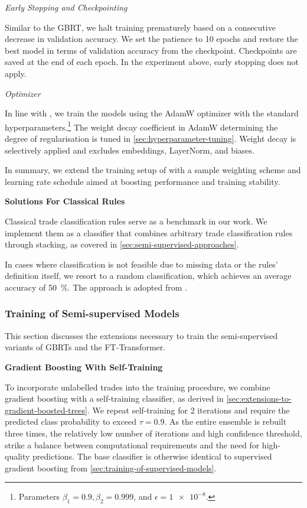 \emph{Early Stopping and Checkpointing}

Similar to the \gls{GBRT}, we halt training prematurely based on a consecutive decrease in validation accuracy. We set the patience to \num{10} epochs and restore the best model in terms of validation accuracy from the checkpoint. Checkpoints are saved at the end of each epoch. In the experiment above, early stopping does not apply.

\emph{Optimizer}

In line with \textcite[][6]{gorishniyRevisitingDeepLearning2021}, we train the models using the AdamW optimizer \autocite[][2--3]{loshchilovDecoupledWeightDecay2019} with the standard hyperparameters.\footnote{Parameters $\beta_{1}=0.9, \beta_{2}=0.999$, and $\epsilon = \num{1e-8}$.} The weight decay coefficient in AdamW determining the degree of regularisation is tuned in \cref{sec:hyperparameter-tuning}. Weight decay is selectively applied and excludes embeddings, LayerNorm, and biases.

In summary, we extend the training setup of \textcite[][6]{gorishniyRevisitingDeepLearning2021} with a sample weighting scheme and learning rate schedule aimed at boosting performance and training stability.

\textbf{Solutions For Classical Rules}

Classical trade classification rules serve as a benchmark in our work. We implement them as a classifier that combines arbitrary trade classification rules through stacking, as covered in \cref{sec:semi-supervised-approaches}.

In cases where classification is not feasible due to missing data or the rules' definition itself, we resort to a random classification, which achieves an average accuracy of \SI{50}{\percent}. The approach is adopted from \textcite[][887]{savickasInferringDirectionOption2003}.

\subsubsection{Training of Semi-supervised
    Models}\label{sec:training-of-semi-supervised-models}

This section discusses the extensions necessary to train the semi-supervised variants of \glspl{GBRT} and the FT-Transformer.

\textbf{Gradient Boosting With Self-Training}

To incorporate unlabelled trades into the training procedure, we combine gradient boosting with a self-training classifier, as derived in \cref{sec:extensions-to-gradient-boosted-trees}. We repeat self-training for 2 iterations and require the predicted class probability to exceed $\tau=0.9$. As the entire ensemble is rebuilt three times, the relatively low number of iterations and high confidence threshold, strike a balance between computational requirements and the need for high-quality predictions. The base classifier is otherwise identical to supervised gradient boosting from \cref{sec:training-of-supervised-models}.

